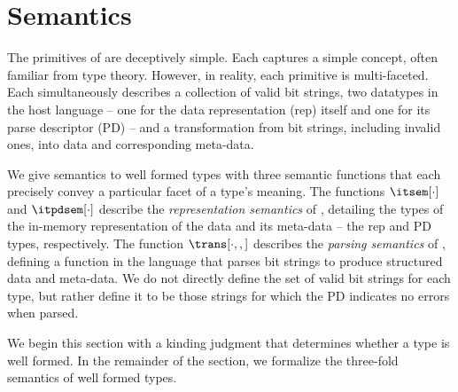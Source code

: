 \section{\ddc{} Semantics}
\label{sec:ddc-sem}

The primitives of \ddc{} are deceptively simple.  Each captures a
simple concept, often familiar from type theory. However, in reality,
each primitive is multi-faceted. Each simultaneously describes a
collection of valid bit strings, two datatypes in the host language --
one for the data representation (rep) itself and one for its parse
descriptor (PD) -- and a transformation from bit strings, including
invalid ones, into data and corresponding meta-data.


We give semantics to well formed types with three semantic functions
that each precisely convey a particular facet of a type's meaning.
The functions $\itsem[\cdot]$ and $\itpdsem[\cdot]$ describe the {\it
  representation semantics} of \ddc{}, detailing the types of the
in-memory representation of the data and its meta-data -- the rep and
PD types, respectively. The function $\trans[\cdot,,]$ describes the
{\it parsing semantics} of \ddc{}, defining a function in the
\implang{} language that parses bit strings to produce structured data
and meta-data. We do not directly define the set of valid bit strings
for each type, but rather define it to be those strings for which the PD
indicates no errors when parsed.

We begin this section with a kinding judgment that determines whether
a type is well formed. In the remainder of the section, we formalize
the three-fold semantics of well formed \ddc{} types.

